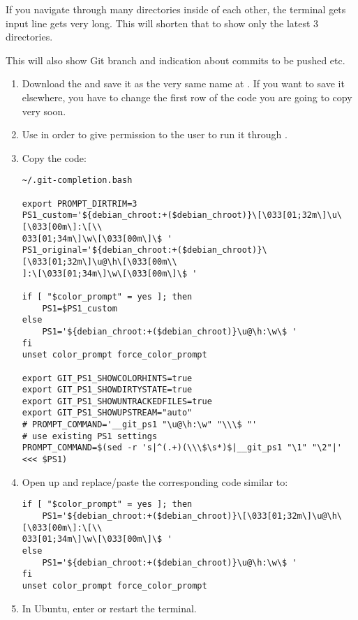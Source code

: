 
If you navigate through many directories inside of each other, the terminal gets input line gets very long. This will shorten that to show only the latest 3 directories.

This will also show Git branch and indication about commits to be pushed etc.

\begin{enumerate}
    \item Download the  and save it as the very same name at . If you want to save it elsewhere, you have to change the first row of the code you are going to copy very soon.
    
    \item Use  in order to give permission to the user to run it through .
    
    \item Copy the code:
    
    \begin{verbatim}
~/.git-completion.bash

export PROMPT_DIRTRIM=3
PS1_custom='${debian_chroot:+($debian_chroot)}\[\033[01;32m\]\u\[\033[00m\]:\[\\
033[01;34m\]\w\[\033[00m\]\$ '
PS1_original='${debian_chroot:+($debian_chroot)}\[\033[01;32m\]\u@\h\[\033[00m\\
]:\[\033[01;34m\]\w\[\033[00m\]\$ '

if [ "$color_prompt" = yes ]; then
    PS1=$PS1_custom
else
    PS1='${debian_chroot:+($debian_chroot)}\u@\h:\w\$ '
fi
unset color_prompt force_color_prompt

export GIT_PS1_SHOWCOLORHINTS=true
export GIT_PS1_SHOWDIRTYSTATE=true
export GIT_PS1_SHOWUNTRACKEDFILES=true
export GIT_PS1_SHOWUPSTREAM="auto" 
# PROMPT_COMMAND='__git_ps1 "\u@\h:\w" "\\\$ "'
# use existing PS1 settings
PROMPT_COMMAND=$(sed -r 's|^(.+)(\\\$\s*)$|__git_ps1 "\1" "\2"|' <<< $PS1)
    \end{verbatim}

    \item Open up  and replace/paste the corresponding code similar to:

    \begin{verbatim}
if [ "$color_prompt" = yes ]; then
    PS1='${debian_chroot:+($debian_chroot)}\[\033[01;32m\]\u@\h\[\033[00m\]:\[\\
033[01;34m\]\w\[\033[00m\]\$ '
else
    PS1='${debian_chroot:+($debian_chroot)}\u@\h:\w\$ '
fi
unset color_prompt force_color_prompt
    \end{verbatim}

    \item In Ubuntu, enter  or restart the terminal.
\end{enumerate}
